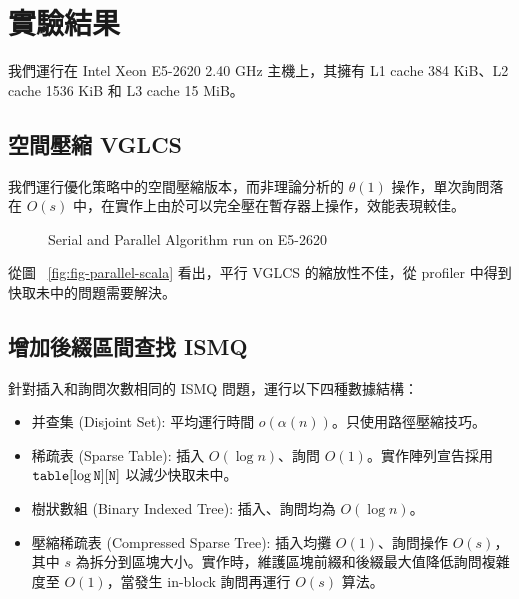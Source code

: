 \section{實驗結果}
\label{sec:Experiment}

我們運行在 Intel Xeon E5-2620 2.40 GHz 主機上，其擁有 L1 cache 384 KiB、L2 cache 1536 KiB 和 L3 cache 15 MiB。

\subsection{空間壓縮 VGLCS}

我們運行優化策略中的空間壓縮版本，而非理論分析的 $\theta(1)$ 操作，單次詢問落在 $O(s)$ 中，在實作上由於可以完全壓在暫存器上操作，效能表現較佳。

\begin{figure*}[!thb]
  \centering
  \caption{Serial and Parallel Algorithm run on E5-2620}
\end{figure*}

從圖 ~\ref{fig:fig-parallel-scala} 看出，平行 VGLCS 的縮放性不佳，從 profiler 中得到快取未中的問題需要解決。



\subsection{增加後綴區間查找 ISMQ}

針對插入和詢問次數相同的 ISMQ 問題，運行以下四種數據結構：

\begin{itemize}
  \item 并查集 (Disjoint Set): 平均運行時間 $o(\alpha(n))$。只使用路徑壓縮技巧。
  \item 稀疏表 (Sparse Table): 插入 $O(\log n)$、詢問 $O(1)$。實作陣列宣告採用 $\tt{table}[\log N][N]$ 以減少快取未中。
  \item 樹狀數組 (Binary Indexed Tree): 插入、詢問均為 $O(\log n)$。
  \item 壓縮稀疏表 (Compressed Sparse Tree): 插入均攤 $O(1)$、詢問操作 $O(s)$，其中 $s$ 為拆分到區塊大小。實作時，維護區塊前綴和後綴最大值降低詢問複雜度至 $O(1)$，當發生 in-block 詢問再運行 $O(s)$ 算法。
\end{itemize}

